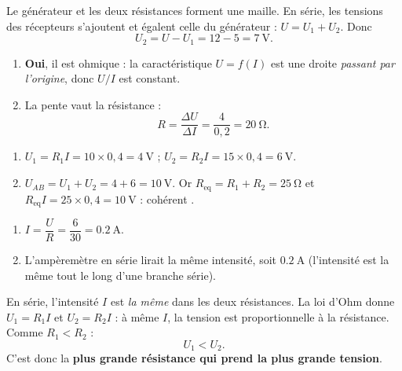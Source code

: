 \documentclass[11pt,a4paper]{article}
\begin{document}
\usetikzlibrary{babel}
\begin{corrige}
Le générateur et les deux résistances forment une maille. En série, les tensions des récepteurs
s'ajoutent et égalent celle du générateur : $U=U_1+U_2$. Donc
\[ U_2=U-U_1=12-5=\qty{7}{\volt}. \]
\end{corrige}

\begin{corrige}
\begin{enumerate}[label=\alph*)]
  \item \textbf{Oui}, il est ohmique : la caractéristique $U=f(I)$ est une droite \emph{passant par
        l'origine}, donc $U/I$ est constant.
  \item La pente vaut la résistance :
        \[ R=\frac{\Delta U}{\Delta I}=\frac{4}{0{,}2}=\qty{20}{\ohm}. \]
\end{enumerate}
\end{corrige}

\begin{corrige}
\begin{enumerate}[label=\alph*)]
  \item $U_1=R_1 I=10\times0{,}4=\qty{4}{\volt}$ ; \quad $U_2=R_2 I=15\times0{,}4=\qty{6}{\volt}$.
  \item $U_{AB}=U_1+U_2=4+6=\qty{10}{\volt}$. Or $R_{\text{eq}}=R_1+R_2=\qty{25}{\ohm}$ et
        $R_{\text{eq}}I=25\times0{,}4=\qty{10}{\volt}$ : cohérent \checkmark.
\end{enumerate}
\end{corrige}

\begin{corrige}
\begin{enumerate}[label=\alph*)]
  \item $I=\dfrac{U}{R}=\dfrac{6}{30}=\qty{0.2}{\ampere}$.
  \item L'ampèremètre en série lirait la même intensité, soit $\qty{0.2}{\ampere}$ (l'intensité est la
        même tout le long d'une branche série).
\end{enumerate}
\end{corrige}

\begin{corrige}
En série, l'intensité $I$ est \emph{la même} dans les deux résistances. La loi d'Ohm donne
$U_1=R_1 I$ et $U_2=R_2 I$ : à même $I$, la tension est proportionnelle à la résistance. Comme
$R_1<R_2$ :
\[ U_1<U_2. \]
C'est donc la \textbf{plus grande résistance qui prend la plus grande tension}.
\end{corrige}
\end{document}
